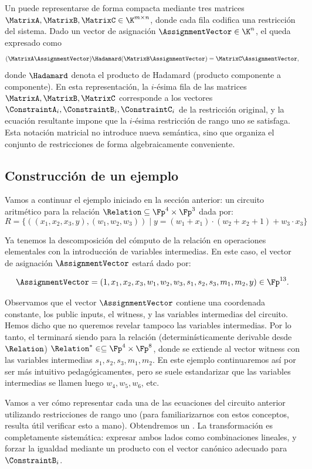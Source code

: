 Un \ROneCS puede representarse de forma compacta mediante tres matrices $\MatrixA, \MatrixB, \MatrixC \in \K^{m \times n}$, donde cada fila codifica una restricción del sistema. Dado un vector de asignación $\AssignmentVector \in \K^n$, el \ROneCS queda expresado como
$$(\MatrixA\AssignmentVector) \Hadamard (\MatrixB\AssignmentVector) = \MatrixC\AssignmentVector,$$
donde $\Hadamard$ denota el producto de Hadamard (producto componente a componente). En esta representación, la $i$-ésima fila de las matrices $\MatrixA,\MatrixB,\MatrixC$ corresponde a los vectores $\ConstraintA_i, \ConstraintB_i, \ConstraintC_i$ de la restricción original, y la ecuación resultante impone que la $i$-ésima restricción de rango uno se satisfaga. Esta notación matricial no introduce nueva semántica, sino que organiza el conjunto de restricciones de forma algebraicamente conveniente.

\subsection{Construcción de un ejemplo}

Vamos a continuar el ejemplo iniciado en la sección anterior: un circuito aritmético para la relación $\Relation \subseteq \Fp^4 \times \Fp^3$ dada por:
$$R = \{((x_1, x_2, x_3, y), (w_1, w_2, w_3)) \mid y = (w_1 + x_1) \cdot (w_2 + x_2 + 1) + w_3 \cdot x_3\}$$

Ya tenemos la descomposición del cómputo de la relación en operaciones elementales con la introducción de variables intermedias. En este caso, el vector de asignación $\AssignmentVector$ estará dado por:

$$\AssignmentVector = (1, x_1, x_2, x_3, w_1, w_2, w_3, s_1, s_2, s_3, m_1, m_2, y) \in \Fp^{13}.$$

Observamos que el vector $\AssignmentVector$ contiene una coordenada constante, los public inputs, el witness, y las variables intermedias del circuito. Hemos dicho que no queremos revelar tampoco las variables intermedias. Por lo tanto, el \ROneCS terminará siendo para la relación (determinísticamente derivable desde $\Relation$) $\Relation^* \in \subseteq \Fp^4 \times \Fp^8$, donde se extiende al vector witness con las variables intermedias $s_1, s_2, s_3, m_1, m_2$. En este ejemplo continuaremos así por ser más intuitivo pedagógicamentes, pero se suele estandarizar que las variables intermedias se llamen luego $w_4, w_5, w_6$, etc.

Vamos a ver cómo representar cada una de las ecuaciones del circuito anterior utilizando restricciones de rango uno (para familiarizarnos con estos conceptos, resulta útil verificar esto a mano). Obtendremos un \ROneCS. La transformación es completamente sistemática: expresar ambos lados como combinaciones lineales, y forzar la igualdad mediante un producto con el vector canónico adecuado para $\ConstraintB_i$.

